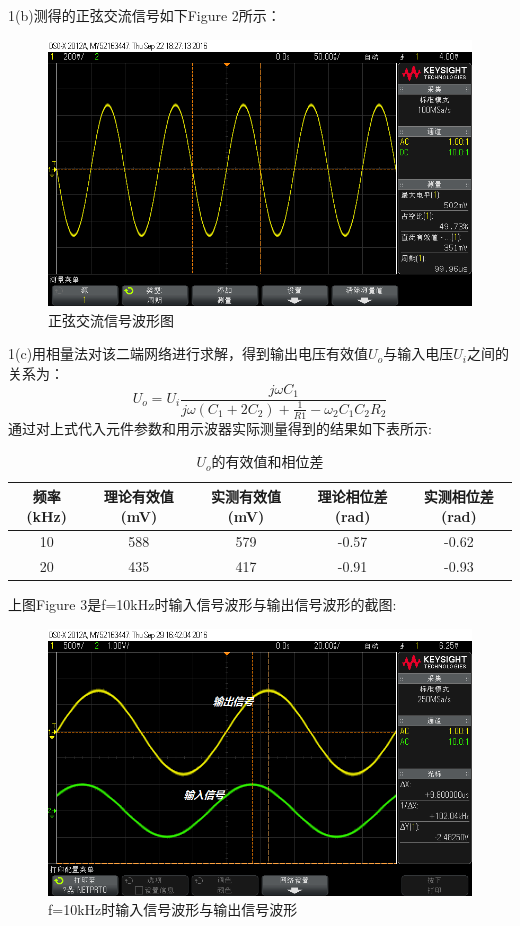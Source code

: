 ﻿\documentclass[10.5pt]{ctexart}
\begin{document}
1(b)\quad 测得的正弦交流信号如下Figure 2所示：
\begin{figure}[!ht]
\centering
\caption{正弦交流信号波形图}
\includegraphics[width=350pt]{image/SineWave.png}
\end{figure}

1(c)用相量法对该二端网络进行求解，得到输出电压有效值$U_o$与输入电压$U_i$之间的关系为：
\begin{equation}
U_o=U_i \frac{j \omega C_1}{j \omega (C_1+2C_2) +\frac{1}{R1}-\omega_2 C_1 C_2 R_2}
\end{equation}
通过对上式代入元件参数和用示波器实际测量得到的结果如下表所示:
\begin{table}[!ht]
\centering
\caption{$U_o$的有效值和相位差}
\begin{tabular}{ccccc}
\hline
频率(kHz) & 理论有效值(mV) & 实测有效值(mV) & 理论相位差(rad) & 实测相位差(rad) \\
\hline
10 & 588 & 579 & -0.57 & -0.62 \\
20 & 435 & 417 & -0.91 & -0.93 \\
\hline
\end{tabular}
\end{table}

上图Figure 3是f=10kHz时输入信号波形与输出信号波形的截图:
\begin{figure}
\centering
\caption{f=10kHz时输入信号波形与输出信号波形}
\includegraphics[width=350pt]{image/InputSignalWaveFormAndOutputSignalWaveForm.png}
\end{figure}
\end{document}

